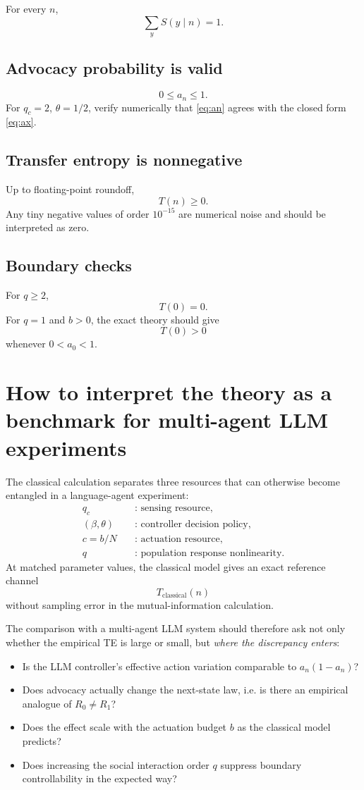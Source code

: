 \documentclass[11pt,a4paper]{article}
\newcommand{\1}{\mathbbm{1}}
\begin{document}
For every $n$,
\[
\sum_y S(y\mid n)=1.
\]

\subsection{Advocacy probability is valid}

\[
0\le a_n\le1.
\]
For $q_c=2$, $\theta=1/2$, verify numerically that \cref{eq:an} agrees with the closed form \cref{eq:ax}.

\subsection{Transfer entropy is nonnegative}

Up to floating-point roundoff,
\[
T(n)\ge0.
\]
Any tiny negative values of order $10^{-15}$ are numerical noise and should be interpreted as zero.

\subsection{Boundary checks}

For $q\ge2$,
\[
T(0)=0.
\]
For $q=1$ and $b>0$, the exact theory should give
\[
T(0)>0
\]
whenever $0<a_0<1$.

\section{How to interpret the theory as a benchmark for multi-agent LLM experiments}

The classical calculation separates three resources that can otherwise become entangled in a language-agent experiment:
\begin{align*}
q_c &\quad\text{: sensing resource},\\
(\beta,\theta) &\quad\text{: controller decision policy},\\
c=b/N &\quad\text{: actuation resource},\\
q &\quad\text{: population response nonlinearity}.
\end{align*}
At matched parameter values, the classical model gives an exact reference channel
\[
T_{\mathrm{classical}}(n)
\]
without sampling error in the mutual-information calculation.

The comparison with a multi-agent LLM system should therefore ask not only whether the empirical TE is large or small, but \emph{where the discrepancy enters}:
\begin{itemize}[leftmargin=1.5em]
\item Is the LLM controller's effective action variation comparable to $a_n(1-a_n)$?
\item Does advocacy actually change the next-state law, i.e. is there an empirical analogue of $R_0\neq R_1$?
\item Does the effect scale with the actuation budget $b$ as the classical model predicts?
\item Does increasing the social interaction order $q$ suppress boundary controllability in the expected way?
\end{itemize}
\end{document}
